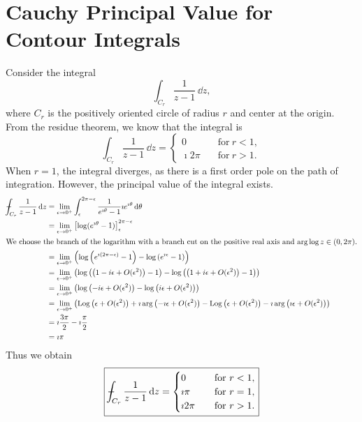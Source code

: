 \section{Cauchy Principal Value for Contour Integrals}





\begin{Example}
  Consider the integral
  \[
  \int_{C_r} \frac{1}{z-1} \,\dd z,
  \]
  where $C_r$ is the positively oriented circle of radius $r$ and center at 
  the origin.  From the residue theorem, we know that the integral is
  \[
  \int_{C_r} \frac{1}{z-1} \,\dd z
  = \begin{cases}
    0 \quad &\mathrm{for}\ r < 1, \\
    \imath 2 \pi \quad &\mathrm{for}\ r > 1.
  \end{cases}
  \]
  When $r=1$, the integral diverges, as there is a first order pole on the
  path of integration.  However, the principal value of the integral exists.
  \begin{align*}
    - \negthickspace \negthickspace \negthickspace \negmedspace \int_{C_r} \frac{1}{z-1} \,\mathrm{d} z
    &= \lim_{\epsilon \to 0^+} \int_\epsilon^{2\pi - \epsilon}
    \frac{1}{e^{\imath \theta} - 1} \imath e^{\imath \theta} \,\mathrm{d} \theta \\
    &= \lim_{\epsilon \to 0^+} \left[ \log(e^{\imath \theta}-1)
    \right]_\epsilon^{2\pi - \epsilon} \\
    \intertext{We choose the branch of the logarithm with a branch cut on the 
      positive real axis and $\arg\log z \in (0,2\pi)$.}
    &= \lim_{\epsilon \to 0^+} \left( 
      \log \left( e^{\imath (2\pi - \epsilon)} - 1  \right) -
      \log \left( e^{\imath \epsilon} - 1 \right) \right) \\
    &= \lim_{\epsilon \to 0^+} \left( 
      \log \left( \left( 1 - i\epsilon + O(\epsilon^2) \right) - 1 \right) -
      \log \left( \left( 1 + i\epsilon + O(\epsilon^2) \right) - 1 \right) 
    \right) \\
    &= \lim_{\epsilon \to 0^+} \left( 
      \log \left( - i\epsilon + O(\epsilon^2) \right) -
      \log \left( i\epsilon + O(\epsilon^2) \right) 
    \right) \\
    &= \lim_{\epsilon \to 0^+} \left( 
      \mathop{\mathrm{Log}}\nolimits \left( \epsilon + O(\epsilon^2) \right) 
      + \imath \arg\left( -\imath \epsilon + O(\epsilon^2) \right) -
      \mathop{\mathrm{Log}}\nolimits \left( \epsilon + O(\epsilon^2) \right) 
      - \imath \arg\left( \imath \epsilon + O(\epsilon^2) \right)
    \right) \\
    &= \imath \frac{3\pi}{2} - \imath \frac{\pi}{2} \\
    &= \imath \pi
  \end{align*}
  Thus we obtain 
  \[
  \boxed{
    - \negthickspace \negthickspace \negthickspace \negmedspace \int_{C_r} \frac{1}{z-1} \,\mathrm{d} z
    = \begin{cases}
      0 \quad &\mathrm{for}\ r < 1, \\
      \imath \pi \quad &\mathrm{for}\ r = 1, \\
      \imath 2 \pi \quad &\mathrm{for}\ r > 1.
    \end{cases}
    }
  \]
\end{Example}




